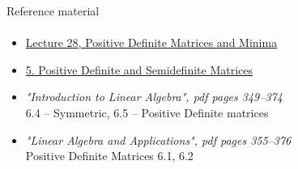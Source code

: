 \documentclass[aspectratio=169]{beamer}
\newcommand{\fbckg}[1]{\usebackgroundtemplate{\texttt{[image: \#1]}}}%
\begin{document}
\begin{frame}[t]{Reference material}
    \framesubtitle{}
    \Large
    \begin{itemize}
        \item \href{https://www.youtube.com/watch?v=vF7eyJ2g3kU&list=PL49CF3715CB9EF31D&index=28}{Lecture 28, Positive Definite Matrices and Minima}
        \item \href{https://www.youtube.com/watch?v=xsP-S7yKaRA&list=PLUl4u3cNGP63oMNUHXqIUcrkS2PivhN3k&index=7}{5. Positive Definite and Semidefinite Matrices}
        \item \textit{"Introduction to Linear Algebra", pdf pages 349--374 }\\  6.4 -- Symmetric, 6.5 -- Positive Definite matrices
        \item \textit{"Linear Algebra and Applications", pdf pages 355--376 }\\ Positive Definite Matrices 6.1, 6.2
    \end{itemize}
\end{frame}

\fbckg{fibeamer/figs/last_page.png}
\frame[plain]{}
\end{document}
